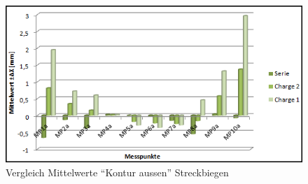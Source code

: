 \documentclass[12pt,a4paper,parskip]{scrartcl}
\begin{document}
\begin{figure}[!htb] 
\centering
\includegraphics[width=1\linewidth,height=.3\textheight]{mitkontausstrckb}
\caption{Vergleich Mittelwerte "`Kontur aussen"' Streckbiegen}
\label{fig:mitstrckb}
\end{figure}

\newpage
\end{document}
